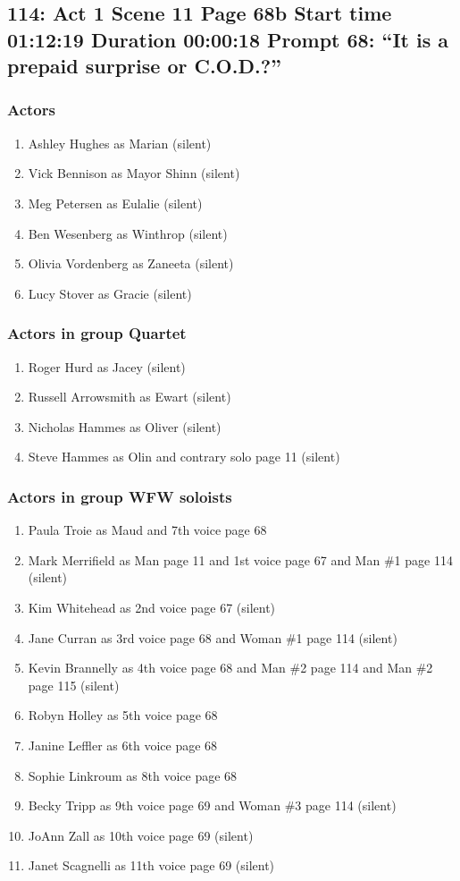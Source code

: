 \subsection{114: Act 1 Scene 11 Page 68b Start time 01:12:19 Duration 00:00:18 Prompt 68: ``It is a prepaid surprise or C.O.D.?''}

\subsubsection{Actors}
\begin{enumerate}
\item Ashley Hughes as Marian (silent)
\item Vick Bennison as Mayor Shinn (silent)
\item Meg Petersen as Eulalie (silent)
\item Ben Wesenberg as Winthrop (silent)
\item Olivia Vordenberg as Zaneeta (silent)
\item Lucy Stover as Gracie (silent)
\end{enumerate}
\subsubsection{Actors in group Quartet}
\begin{enumerate}
\item Roger Hurd as Jacey (silent)
\item Russell Arrowsmith as Ewart (silent)
\item Nicholas Hammes as Oliver (silent)
\item Steve Hammes as Olin and contrary solo page 11 (silent)
\end{enumerate}
\subsubsection{Actors in group WFW soloists}
\begin{enumerate}
\item Paula Troie as Maud and 7th voice page 68
\item Mark Merrifield as Man page 11 and 1st voice page 67 and Man \#1 page 114 (silent)
\item Kim Whitehead as 2nd voice page 67 (silent)
\item Jane Curran as 3rd voice page 68 and Woman \#1 page 114 (silent)
\item Kevin Brannelly as 4th voice page 68 and Man \#2 page 114 and Man \#2 page 115 (silent)
\item Robyn Holley as 5th voice page 68
\item Janine Leffler as 6th voice page 68
\item Sophie Linkroum as 8th voice page 68
\item Becky Tripp as 9th voice page 69 and Woman \#3 page 114 (silent)
\item JoAnn Zall as 10th voice page 69 (silent)
\item Janet Scagnelli as 11th voice page 69 (silent)
\end{enumerate}

